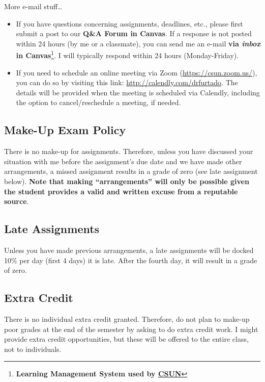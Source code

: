 \documentclass[11pt,]{article}
\begin{document}
More e-mail stuff\ldots{}

\begin{itemize}
\item
  If you have questions concerning assignments, deadlines, etc., please
  first submit a post to our \textbf{Q\&A Forum in Canvas}. If a
  response is not posted within 24 hours (by me or a classmate), you can
  send me an e-mail \textbf{via \emph{inbox} in Canvas}\footnote{\textbf{Learning
    Management System used by
    \href{https://www.csun.edu/it/canvas}{CSUN}}}. I will typically
  respond within 24 hours (Monday-Friday).
\item
  If you need to schedule an online meeting via Zoom
  (\url{https://csun.zoom.us/}), you can do so by visiting this link:
  \url{http://calendly.com/drfurtado}. The details will be provided when
  the meeting is scheduled via Calendly, including the option to
  cancel/reschedule a meeting, if needed.
\end{itemize}

\hypertarget{make-up-exam-policy}{%
\subsection{Make-Up Exam Policy}\label{make-up-exam-policy}}

There is no make-up for assignments. Therefore, unless you have
discussed your situation with me before the assignment's due date and we
have made other arrangements, a missed assignment results in a grade of
zero (see late assignment below). \textbf{Note that making
``arrangements'' will only be possible given the student provides a
valid and written excuse from a reputable source}.

\hypertarget{late-assignments}{%
\subsection{Late Assignments}\label{late-assignments}}

Unless you have made previous arrangements, a late assignments will be
docked 10\% per day (first 4 days) it is late. After the fourth day, it
will result in a grade of zero.

\hypertarget{extra-credit}{%
\subsection{Extra Credit}\label{extra-credit}}

There is no individual extra credit granted. Therefore, do not plan to
make-up poor grades at the end of the semester by asking to do extra
credit work. I might provide extra credit opportunities, but these will
be offered to the entire class, not to individuals.
\end{document}

